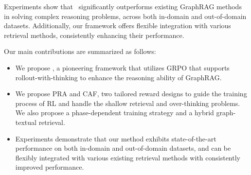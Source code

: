Experiments show that \methodname~significantly outperforms existing GraphRAG methods in solving complex reasoning problems, across both in-domain and out-of-domain datasets. Additionally, our framework offers flexible integration with various retrieval methods, consistently enhancing their performance.

Our main contributions are summarized as follows:
\begin{itemize}[leftmargin=0.5cm]
\item We propose \methodname, a pioneering framework that utilizes GRPO that supports rollout-with-thinking to enhance the reasoning ability of GraphRAG. %
\item We propose PRA and CAF, two tailored reward designs to guide the training process of RL and handle the shallow retrieval and over-thinking problems. We also propose a phase-dependent training strategy and a hybrid graph-textual retrieval. 

\item Experiments demonstrate that our method exhibits state-of-the-art performance on both in-domain and out-of-domain datasets, and can be flexibly integrated with various existing retrieval methods with consistently improved performance.
\end{itemize}


